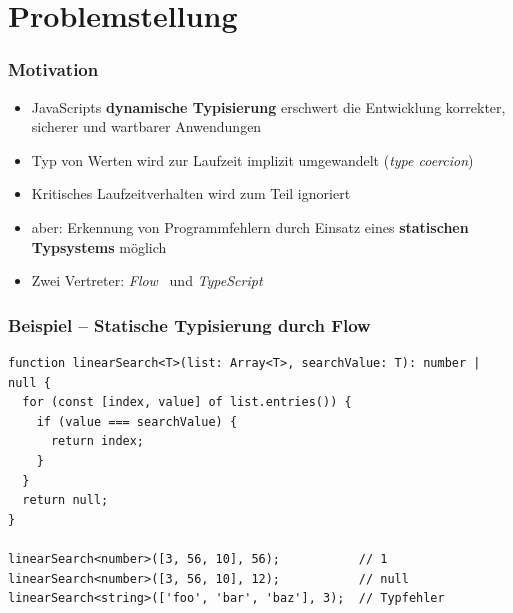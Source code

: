 


  \frame[plain]{\titlepage}


  \section{Problemstellung}

    \begin{frame}
      \frametitle{Motivation}
      \begin{itemize}
        \item JavaScripts \textbf{dynamische Typisierung} erschwert die Entwicklung korrekter, sicherer und wartbarer Anwendungen~\autocite{NIKHIL:2014,PRADEL:2015,BIERMAN:2014}
        \item Typ von Werten wird zur Laufzeit implizit umgewandelt (\textit{type coercion})
        \item Kritisches Laufzeitverhalten wird zum Teil ignoriert
        \item aber: Erkennung von Programmfehlern durch Einsatz eines \textbf{statischen Typsystems} möglich
        \item Zwei Vertreter: \textit{Flow}~\autocite{FLOW:PAPER} und \textit{TypeScript}~\autocite{TYPESCRIPT:SPEC}
      \end{itemize}
    \end{frame}

    \begin{frame}[fragile]
      \frametitle{Beispiel -- Statische Typisierung durch Flow}
      \begin{lstlisting}
function linearSearch<T>(list: Array<T>, searchValue: T): number | null {
  for (const [index, value] of list.entries()) {
    if (value === searchValue) {
      return index;
    }
  }
  return null;
}

linearSearch<number>([3, 56, 10], 56);           // 1
linearSearch<number>([3, 56, 10], 12);           // null
linearSearch<string>(['foo', 'bar', 'baz'], 3);  // Typfehler
      \end{lstlisting}
    \end{frame}

